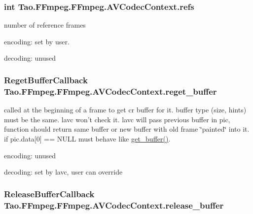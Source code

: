 \hypertarget{struct_tao_1_1_f_fmpeg_1_1_f_fmpeg_1_1_a_v_codec_context_a8d3d430b6109f6b0f621f3c196ae052b}{
\subsubsection[{refs}]{\setlength{\rightskip}{0pt plus 5cm}int {\bf Tao.FFmpeg.FFmpeg.AVCodecContext.refs}}}
\label{struct_tao_1_1_f_fmpeg_1_1_f_fmpeg_1_1_a_v_codec_context_a8d3d430b6109f6b0f621f3c196ae052b}
number of reference frames
\begin{DoxyItemize}
\item encoding: set by user.
\item decoding: unused 
\end{DoxyItemize}\hypertarget{struct_tao_1_1_f_fmpeg_1_1_f_fmpeg_1_1_a_v_codec_context_a8ffd6031f69dd5ce41136d91814a3319}{
\subsubsection[{reget\_\-buffer}]{\setlength{\rightskip}{0pt plus 5cm}RegetBufferCallback {\bf Tao.FFmpeg.FFmpeg.AVCodecContext.reget\_\-buffer}}}
\label{struct_tao_1_1_f_fmpeg_1_1_f_fmpeg_1_1_a_v_codec_context_a8ffd6031f69dd5ce41136d91814a3319}
called at the beginning of a frame to get cr buffer for it. buffer type (size, hints) must be the same. lavc won't check it. lavc will pass previous buffer in pic, function should return same buffer or new buffer with old frame \char`\"{}painted\char`\"{} into it. if pic.data\mbox{[}0\mbox{]} == NULL must behave like \hyperlink{struct_tao_1_1_f_fmpeg_1_1_f_fmpeg_1_1_a_v_codec_context_a48cbd8569687391bccaedb762db94404}{get\_\-buffer()}.
\begin{DoxyItemize}
\item encoding: unused
\item decoding: set by lavc, user can override 
\end{DoxyItemize}\hypertarget{struct_tao_1_1_f_fmpeg_1_1_f_fmpeg_1_1_a_v_codec_context_adcd2bc41718cc8d7ecfb0cb369b34a6a}{
\subsubsection[{release\_\-buffer}]{\setlength{\rightskip}{0pt plus 5cm}ReleaseBufferCallback {\bf Tao.FFmpeg.FFmpeg.AVCodecContext.release\_\-buffer}}}
